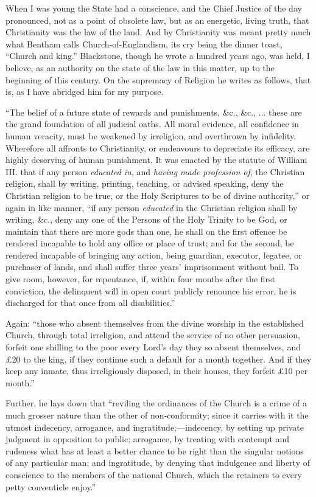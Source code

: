 When I was young the State had a conscience, and the Chief Justice of
the day pronounced, not as a point of obsolete law, but as an energetic,
living truth, that Christianity was the law of the land. And by
Christianity was meant pretty much what Bentham calls Church-of-Englandism,
its cry being the dinner toast, ``Church and king.'' Blackstone,
though he wrote a hundred years ago, was held, I believe, as an
authority on the state of the law in this matter, up to the beginning of
this century. On the supremacy of Religion he writes as follows, that
is, as I have abridged him for my purpose.

``The belief of a future state of rewards and punishments,
\&c., \&c., ... these are the grand foundation of all judicial
oaths. All moral evidence, all confidence in human veracity, must be
weakened by irreligion, and overthrown by infidelity. Wherefore all
affronts to Christianity, or endeavours to depreciate its efficacy, are
highly deserving of human punishment. It was enacted by the statute of
William III. that if any person \emph{educated in}, and \emph{having made
profession of}, the Christian religion, shall by writing, printing,
teaching, or advised speaking, deny the Christian religion to be true,
or the Holy Scriptures to be of divine authority,'' or again in like
manner, ``if any person \emph{educated} in the Christian religion
shall by writing, \&c., deny any one of the Persons of the Holy
Trinity to be God, or maintain that there are more gods than one, he
shall on the first offence be rendered incapable to hold any office or
place of trust; and for the second, be rendered incapable of bringing
any action, being guardian, executor, legatee, or purchaser of lands,
and shall suffer three years' imprisonment without bail. To give
room, however, for repentance, if, within four months after the first
conviction, the delinquent will in open court publicly renounce his
error, he is discharged for that once from all disabilities.''

Again: ``those who absent themselves from the divine worship in
the established Church, through total irreligion, and attend the service
of no other persuasion, forfeit one shilling to the poor every Lord's
day they so absent themselves, and £20 to the king, if they continue
such a default for a month together. And if they keep any inmate, thus
irreligiously disposed, in their houses, they forfeit £10 per
month.''

Further, he lays down that ``reviling the ordinances of the
Church is a crime of a much grosser nature than the other of
non-conformity; since it carries with it the utmost indecency,
arrogance, and ingratitude;—indecency, by setting up private judgment
in opposition to public; arrogance, by treating with contempt and
rudeness what has at least a better chance to be right than the singular
notions of any particular man; and ingratitude, by denying that
indulgence and liberty of conscience to the members of the national
Church, which the retainers to every petty conventicle enjoy.''

